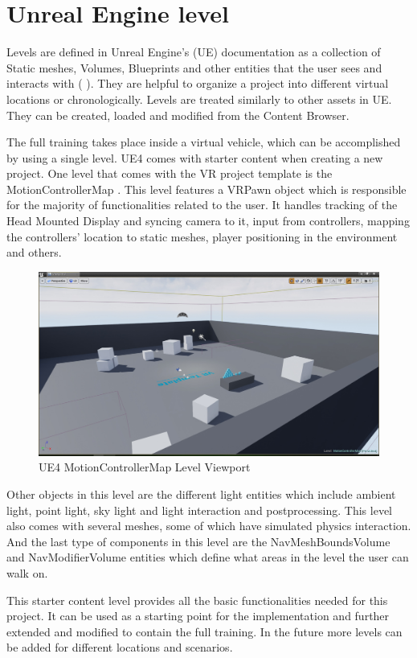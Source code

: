 \documentclass[12pt, a4paper,oneside, nocenter]{thesis}
\newcommand{\citeyeartitlexamkinline}[1]{(\usebibentry{#1}{title} \citeyear{#1})}
\begin{document}
\section{Unreal Engine level}
Levels are defined in Unreal Engine's (UE) documentation as a collection of Static meshes, Volumes, Blueprints and other entities that the user sees and interacts with \citeyeartitlexamkinline{ue-levels}. They are helpful to organize a project into different virtual locations or chronologically. Levels are treated similarly to other assets in UE. They can be created, loaded and modified from the Content Browser.
\par
The full training takes place inside a virtual vehicle, which can be accomplished by using a single level. UE4 comes with starter content when creating a new project. One level that comes with the VR project template is the MotionControllerMap . This level features a VRPawn object which is responsible for the majority of functionalities related to the user. It handles tracking of the Head Mounted Display and syncing camera to it, input from controllers, mapping the controllers' location to static meshes, player positioning in the environment and others.
\begin{figure}[H]
	\includegraphics[width=\textwidth]{level-ue4-editor}
	\caption{UE4 MotionControllerMap Level Viewport}
	\label{fig:level-ue4-editor}
\end{figure}
Other objects in this level are the different light entities which include ambient light, point light, sky light and light interaction and postprocessing. This level also comes with several meshes, some of which have simulated physics interaction. And the last type of components in this level are the NavMeshBoundsVolume and NavModifierVolume entities which define what areas in the level the user can walk on.
\par
This starter content level provides all the basic functionalities needed for this project. It can be used as a starting point for the implementation and further extended and modified to contain the full training. In the future more levels can be added for different locations and scenarios.
\end{document}
